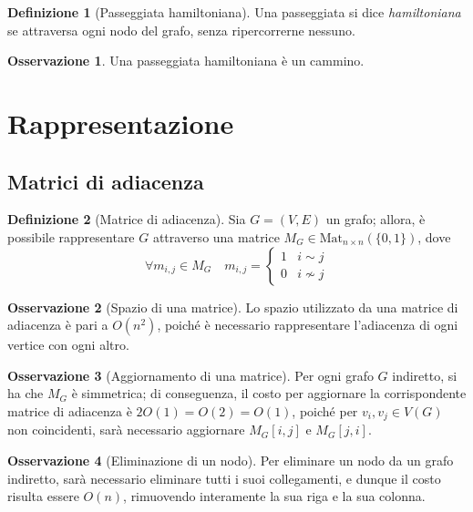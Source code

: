 \documentclass[14pt]{extreport}
\theoremstyle{definition}
\newtheorem{definition}{Definizione}[subsection]
\theoremstyle{definition}
\newtheorem{remark}{Osservazione}[subsection]
\begin{document}
\begin{definition}[Passeggiata hamiltoniana]
    Una passeggiata si dice \textit{hamiltoniana} se attraversa ogni nodo del grafo, senza ripercorrerne nessuno.
\end{definition}

\begin{remark}
    Una passeggiata hamiltoniana è un cammino.
\end{remark}

\section{Rappresentazione}

\subsection{Matrici di adiacenza}

\begin{definition}[Matrice di adiacenza]
    Sia $G = (V, E)$ un grafo; allora, è possibile rappresentare $G$ attraverso una matrice $M_G \in \textrm{Mat}_{n \times n}(\{0, 1\})$, dove $$\forall m_{i, j} \in M_G \quad m_{i, j} = \left \{ \begin{array}{ll} 1 & i \sim j\\ 0 & i \nsim j \end{array} \right.$$
\end{definition}

\begin{remark}[Spazio di una matrice]
    Lo spazio utilizzato da una matrice di adiacenza è pari a $O(n^2)$, poiché è necessario rappresentare l'adiacenza di ogni vertice con ogni altro.
\end{remark}

\begin{remark}[Aggiornamento di una matrice]
    Per ogni grafo $G$ indiretto, si ha che $M_G$ è simmetrica; di conseguenza, il costo per aggiornare la corrispondente matrice di adiacenza è $2 O(1)= O(2) = O(1)$, poiché per $v_i, v_j \in V(G)$ non coincidenti, sarà necessario aggiornare $M_G[i, j]$ e $M_G[j, i]$.
\end{remark}

\begin{remark}[Eliminazione di un nodo]
    Per eliminare un nodo da un grafo indiretto, sarà necessario eliminare tutti i suoi collegamenti, e dunque il costo risulta essere $O(n)$, rimuovendo interamente la sua riga e la sua colonna.
\end{remark}
\end{document}
